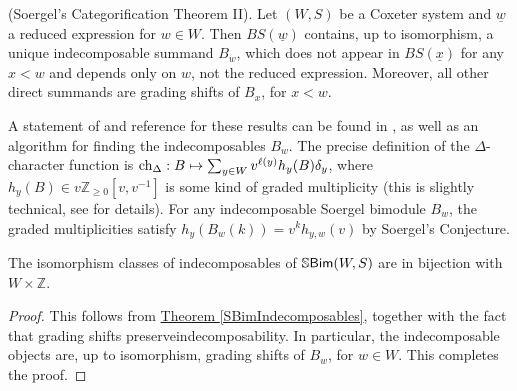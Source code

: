 \noindent\begin{theorem}\textup{(Soergel's Categorification Theorem II).}\label{SBimIndecomposables} Let $(W, S)$ be a Coxeter system and $\underline{w}$ a reduced expression for $w \in W$. Then $BS(\underline{w})$ contains, up to isomorphism, a unique indecomposable summand $B_w$, which does not appear in $BS(\underline{x})$ for any $x < w$ and depends only on $w$, not the reduced expression. Moreover, all other direct summands are grading shifts of $B_x$, for $x < w$.\newpage
\end{theorem}

\noindent A statement of and reference for these results can be found in \cite[Theorem 5.24]{EMTW20}, as well as an algorithm for finding the indecomposables $B_w$. The precise definition of the $\Delta$-character function is $\textup{ch}_\Delta : B \mapsto \sum_{y \in W} v^{\ell(y)} h_y(B) \delta_y$, where $h_y(B) \in v\mathbb{Z}_{\geq 0}[v, v^{-1}]$ is some kind of graded multiplicity (this is slightly technical, see \cite[Theorem 5.10]{EMTW20} for details). For any indecomposable Soergel bimodule $B_w$, the graded multiplicities satisfy $h_y(B_w(k)) = v^k h_{y, w}(v)$ by Soergel's Conjecture.\\

\noindent\begin{corollary}\label{SBimIndecomposablesCardinality} The isomorphism classes of indecomposables of $\mathbb{S}\textup{\textsf{Bim}}(W, S)$ are in bijection with $W \times \mathbb{Z}$.\\
\end{corollary}

\noindent\begin{proof} This follows from \hyperref[SBimIndecomposables]{Theorem \ref*{SBimIndecomposables}}, together with the fact that grading shifts preserve\linebreak indecomposability. In particular, the indecomposable objects are, up to isomorphism, grading shifts of $B_w$, for $w \in W$. This completes the proof.
\end{proof}\\


